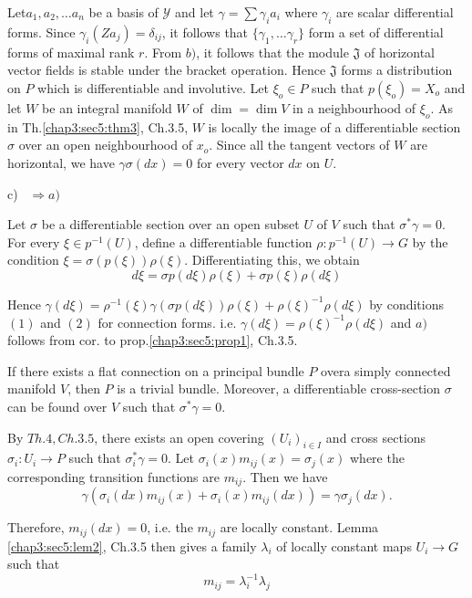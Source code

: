 Let\pageoriginale $a_1,a_2,\ldots a_n$ be a basis of $\mathscr{Y}$ and let $\gamma =
\sum \gamma_i a_i$ where $\gamma_i$ are scalar differential
forms. Since $\gamma_i (Za_j) = \delta_{ij}$, it follows that $\{
\gamma_1,\ldots \gamma_r\}$ form a set of differential forms of
maximal rank $r$. From $b)$, it follows that the module $\mathfrak{J}$
of horizontal vector fields is stable under the bracket
operation. Hence $\mathfrak{J}$ forms a  distribution on $P$ which is
differentiable and involutive. Let $\xi_o \in P$ such that $p(\xi_o) =
X_o$ and let $W$ be an integral manifold $W$ of $\dim = \dim V$ in a
neighbourhood of $\xi_o$. As in Th.\ref{chap3:sec5:thm3}, Ch.3.5, $W$
is locally the image 
of a differentiable section $\sigma$ over an open neighbourhood of
$x_o$. Since all the tangent vectors of $W$ are horizontal, we have
$\gamma \sigma(dx) = 0$ for every vector $dx$ on $U$. 

\noindent c)~ $\Rightarrow a)$ 

Let $\sigma $ be a differentiable section over an open subset $U$ of
$V$ such that $\sigma^* \gamma = 0$. For every $\xi \in p^{-1}(U)$,
define a differentiable function $\rho : p^{-1} (U) \rightarrow G$ by
the condition $\xi = \sigma (p(\xi)) \rho(\xi)$. Differentiating this,
we obtain 
$$
d \xi = \sigma p (d \xi) \rho(\xi) + \sigma p(\xi) \rho(d \xi)
$$

Hence $\gamma (d \xi) = \rho^{-1} (\xi) \gamma (\sigma p (d \xi)) \rho
(\xi) + \rho(\xi)^{-1} \rho (d \xi)$ by conditions $(1)$ and $(2)$ for
connection forms. i.e. $\gamma(d \xi) = \rho (\xi)^{-1} \rho (d \xi)$
and $a)$ follows from cor. to prop.\ref{chap3:sec5:prop1}, Ch.3.5. 

\begin{theorem}\label{chap3:sec6:thm6}%
  If there exists a flat connection on a principal bundle $P$ over\pageoriginale a
  simply connected manifold $V$, then $P$ is a trivial
  bundle. Moreover, a differentiable cross-section $\sigma$ can be
  found over $V$ such that $\sigma^* \gamma = 0$. 
\end{theorem}

By $Th.4, Ch.3.5$, there exists an open covering $(U_i)_{i \in I}$ and
cross sections $\sigma_i : U_i \rightarrow P$ such that $\sigma^*_i
\gamma = 0$. Let $\sigma_i (x) m_{ij}(x) = \sigma_j(x)$ where the
corresponding transition functions are $m_{ij}$. Then we have 
$$
\gamma (\sigma_i(dx) m_{ij} (x) + \sigma_i(x) m_{ij}(dx)) = \gamma
\sigma_j (dx). 
$$

Therefore, $m_{ij}(dx) = 0$, i.e. the $m_{ij}$ are locally
constant. Lemma \ref{chap3:sec5:lem2}, Ch.3.5 then gives a family $\lambda_i$ of
locally constant maps $U_i \rightarrow G$ such that 
$$
m_{ij} = \lambda^{-1}_i \lambda_j
$$

